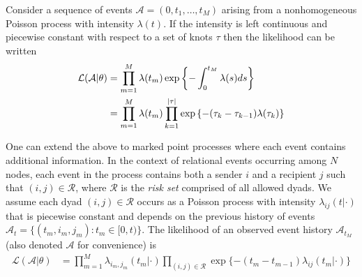 \documentclass{article}
\begin{document}
Consider a sequence of events $\mathcal{A} = (0,t_1, \ldots, t_M)$ arising from a nonhomogeneous Poisson process with  intensity $\lambda(t)$.  If the intensity is left continuous and piecewise constant with respect to a set of knots $\tau$ then the likelihood can be written
\begin{align}
\mathcal{L}(\mathcal{A}|\theta) &= \prod_{m=1}^M \lambda(t_m) \exp\left\{ - \int_{0}^{t_M} \lambda(s)ds \right\} \notag  \\
&= \prod_{m=1}^M \lambda(t_m) \prod_{k=1}^{|\tau|} \exp\left\{ - (\tau_{k} - \tau_{k-1}) \lambda(\tau_k) \right\}%
\end{align}


One can extend the above to marked point processes where each event contains additional information.  In the context of relational events occurring among $N$ nodes, each event in the process contains both a sender $i$ and a recipient $j$ such that  $(i,j) \in \mathcal{R}$, where $\mathcal{R}$ is the \emph{risk set} comprised of all allowed dyads.  We assume each dyad $(i,j) \in \mathcal{R}$ occurs as a Poisson process with intensity $\lambda_{ij}(t|\cdot)$ that is piecewise constant and depends on the previous history of events  $\mathcal{A}_t = \{(t_m,i_m,j_m): t_m \in [0,t) \}$.  The likelihood of an observed event history $\mathcal{A}_{t_M}$ (also denoted $\mathcal{A}$ for convenience) is
\begin{align}
\mathcal{L}(\mathcal{A}|\theta) &= \prod_{m=1}^M \lambda_{i_m,j_m}(t_m|\cdot) \prod_{(i,j) \in \mathcal{R}}\exp\{ - (t_m - t_{m-1}) \lambda_{ij}(t_m | \cdot) \}
\label{eqn:llk}
\end{align}
\end{document}
